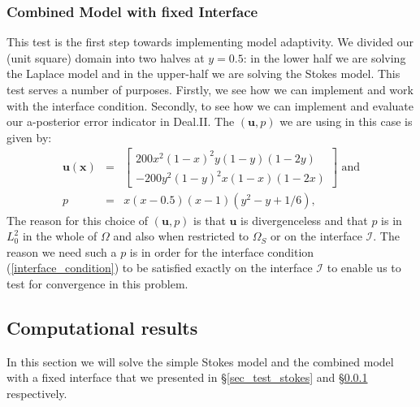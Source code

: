 \documentclass[12pt,a4paper]{article}
\theoremstyle{definition}
\begin{document}
\subsubsection{Combined Model with fixed Interface}\label{sec_test_combi_fixed}
This  test is the first step towards implementing model adaptivity.  We divided our (unit square) domain into two halves at $y=0.5$: in the lower half we are solving the Laplace model and in the upper-half we are solving the Stokes model.  This test serves a number of purposes.
Firstly, we see how we can implement and work with the interface condition.   Secondly, to see how we can implement and evaluate our a-posterior error indicator in Deal.II.   The $\left(\textbf{u},p\right)$ we are using in this case is given by:
\begin{eqnarray}
\label{benchmark_u_mm1}
\textbf{u}\left(\textbf{x}\right)&=&\begin{bmatrix}
200x^2\left(1-x\right)^2y\left(1-y\right)\left(1-2y\right)  \\
-200y^2\left(1-y\right)^2x\left(1-x\right)\left(1-2x\right)  
\end{bmatrix} \text{ and}\\\label{benchmark_p_mm1}
p &=& x\left(x-0.5\right)\left(x-1\right)\left(y^2-y+1/6\right),
\end{eqnarray}
The reason for this choice of $\left(\textbf{u},p\right)$ is that $\textbf{u}$ is divergenceless and that $p$ is in $L^2_0$ in the whole of $\Omega$ and also when restricted to $\Omega_S$ or on the interface $\mathcal{I}$.  The reason we need such a $p$ is in order for the interface condition (\ref{interface_condition}) to be satisfied exactly on the interface $\mathcal{I}$ to enable us to test for convergence in this problem.
\subsection{Computational results}\label{sec_dealii_results}
In this section we will solve the simple Stokes model and the combined model with a fixed interface that we presented in \S \ref{sec_test_stokes} and \S \ref{sec_test_combi_fixed} respectively. 
\end{document}

